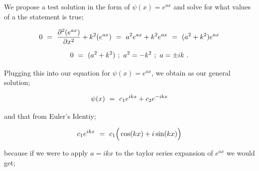 \documentclass{article}
\begin{document}
We propose a test solution in the form of \begin{math} \psi(x) = e^{ax}  \end{math} and solve for what values of a the statement is true; 

\begin{equation} \label{eb-eq-220-1}
0 \hspace{0.125cm} = \hspace{0.125cm} \frac{\partial^2{(e^{ax})}}{\partial{x^2}} + k^2 (e^{ax}) \hspace{0.125cm} = \hspace{0.125cm}  a^2 e^{ax} +  k^2 e^{ax} \hspace{0.125cm} = \hspace{0.125cm} (a^2 + k^2) e^{ax}   
\end{equation}

\begin{equation} \label{eb-eq-221-1}
0 \hspace{0.125cm} = \hspace{0.125cm} (a^2 + k^2) \hspace{0.125cm} ;  \hspace{0.125cm} a^2 = -k^2 \hspace{0.125cm} ; \hspace{0.125cm} a = \pm ik \hspace{0.125cm} .
\end{equation}

Plugging this into our equation for \begin{math} \psi(x) = e^{ax}  \end{math}, we obtain as our general solution;

\begin{equation} \label{eb-eq-222-1}
\psi(x) \hspace{0.125cm} = \hspace{0.125cm} c_1 e^{ikx} + c_2 e^{-ikx}
\end{equation}

and that from Euler's Identiy; 

\begin{equation} \label{eb-eq-223-1}
c_1 e^{ikx} \hspace{0.125cm} = \hspace{0.125cm} c_1 \Big( \cos(kx) + i\sin(kx) \Big) 
\end{equation}

because if we were to apply \begin{math} a = ikx \end{math} to the taylor series expansion of \begin{math} e^{ax} \end{math} we would get; 
\end{document}
